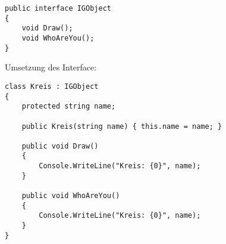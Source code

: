\begin{lstlisting}[style=Csharp]
public interface IGObject
{
    void Draw();
    void WhoAreYou();
}
\end{lstlisting}

Umsetzung des Interface:
\begin{lstlisting}[style=Csharp]
class Kreis : IGObject
{
    protected string name;

    public Kreis(string name) { this.name = name; }

    public void Draw()
    {
        Console.WriteLine("Kreis: {0}", name);
    }
        
    public void WhoAreYou()
    {
        Console.WriteLine("Kreis: {0}", name);
    }
}
\end{lstlisting}